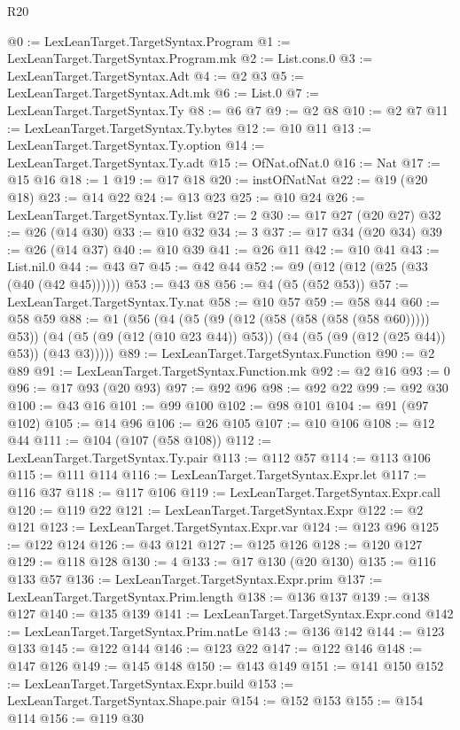 \begin{lexlean}{R20}
\begin{coremodule}
@0 := LexLeanTarget.TargetSyntax.Program
@1 := LexLeanTarget.TargetSyntax.Program.mk
@2 := List.cons.{0}
@3 := LexLeanTarget.TargetSyntax.Adt
@4 := @2 @3
@5 := LexLeanTarget.TargetSyntax.Adt.mk
@6 := List.{0}
@7 := LexLeanTarget.TargetSyntax.Ty
@8 := @6 @7
@9 := @2 @8
@10 := @2 @7
@11 := LexLeanTarget.TargetSyntax.Ty.bytes
@12 := @10 @11
@13 := LexLeanTarget.TargetSyntax.Ty.option
@14 := LexLeanTarget.TargetSyntax.Ty.adt
@15 := OfNat.ofNat.{0}
@16 := Nat
@17 := @15 @16
@18 := 1
@19 := @17 @18
@20 := instOfNatNat
@22 := @19 (@20 @18)
@23 := @14 @22
@24 := @13 @23
@25 := @10 @24
@26 := LexLeanTarget.TargetSyntax.Ty.list
@27 := 2
@30 := @17 @27 (@20 @27)
@32 := @26 (@14 @30)
@33 := @10 @32
@34 := 3
@37 := @17 @34 (@20 @34)
@39 := @26 (@14 @37)
@40 := @10 @39
@41 := @26 @11
@42 := @10 @41
@43 := List.nil.{0}
@44 := @43 @7
@45 := @42 @44
@52 := @9 (@12 (@12 (@25 (@33 (@40 (@42 @45))))))
@53 := @43 @8
@56 := @4 (@5 (@52 @53))
@57 := LexLeanTarget.TargetSyntax.Ty.nat
@58 := @10 @57
@59 := @58 @44
@60 := @58 @59
@88 := @1
    (@56
      (@4
        (@5 (@9 (@12 (@58 (@58 (@58 (@58 @60))))) @53))
        (@4 (@5 (@9 (@12 (@10 @23 @44)) @53)) (@4 (@5 (@9 (@12 (@25 @44)) @53)) (@43 @3)))))
@89 := LexLeanTarget.TargetSyntax.Function
@90 := @2 @89
@91 := LexLeanTarget.TargetSyntax.Function.mk
@92 := @2 @16
@93 := 0
@96 := @17 @93 (@20 @93)
@97 := @92 @96
@98 := @92 @22
@99 := @92 @30
@100 := @43 @16
@101 := @99 @100
@102 := @98 @101
@104 := @91 (@97 @102)
@105 := @14 @96
@106 := @26 @105
@107 := @10 @106
@108 := @12 @44
@111 := @104 (@107 (@58 @108))
@112 := LexLeanTarget.TargetSyntax.Ty.pair
@113 := @112 @57
@114 := @113 @106
@115 := @111 @114
@116 := LexLeanTarget.TargetSyntax.Expr.let
@117 := @116 @37
@118 := @117 @106
@119 := LexLeanTarget.TargetSyntax.Expr.call
@120 := @119 @22
@121 := LexLeanTarget.TargetSyntax.Expr
@122 := @2 @121
@123 := LexLeanTarget.TargetSyntax.Expr.var
@124 := @123 @96
@125 := @122 @124
@126 := @43 @121
@127 := @125 @126
@128 := @120 @127
@129 := @118 @128
@130 := 4
@133 := @17 @130 (@20 @130)
@135 := @116 @133 @57
@136 := LexLeanTarget.TargetSyntax.Expr.prim
@137 := LexLeanTarget.TargetSyntax.Prim.length
@138 := @136 @137
@139 := @138 @127
@140 := @135 @139
@141 := LexLeanTarget.TargetSyntax.Expr.cond
@142 := LexLeanTarget.TargetSyntax.Prim.natLe
@143 := @136 @142
@144 := @123 @133
@145 := @122 @144
@146 := @123 @22
@147 := @122 @146
@148 := @147 @126
@149 := @145 @148
@150 := @143 @149
@151 := @141 @150
@152 := LexLeanTarget.TargetSyntax.Expr.build
@153 := LexLeanTarget.TargetSyntax.Shape.pair
@154 := @152 @153
@155 := @154 @114
@156 := @119 @30

\end{coremodule}
\end{lexlean}

